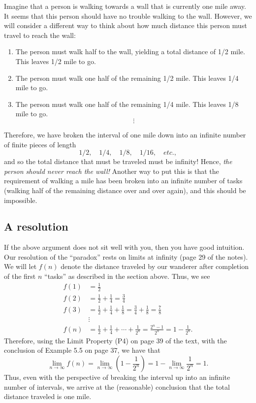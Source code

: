 \noindent Imagine that a person is walking towards a wall that is
currently one mile away.  It seems that this person should have no
trouble walking to the wall.  However, we will consider a different
way to think about how much distance this person must travel to reach
the wall:
\begin{enumerate}%
\item The person must walk half to the wall, yielding a total distance
  of 1/2 mile.  This leaves 1/2 mile to go.
\item The person must walk one half of the remaining 1/2 mile.  This
  leaves 1/4 mile to go.
\item The person must walk one half of the remaining 1/4 mile.  This
  leaves 1/8 mile to go.
  \[\vdots\]
\end{enumerate}
Therefore, we have broken the interval of one mile down into an
infinite number of finite pieces of length
\[
1/2, \quad 1/4,\quad 1/8,\quad 1/16,\quad etc.,
\]
and so the total distance that must be traveled must be infinity!
Hence, \textit{the person should never reach the wall!}  Another way
to put this is that the requirement of walking a mile has been broken
into an infinite number of tasks (walking half of the remaining
distance over and over again), and this should be impossible.

\subsection{A resolution}

If the above argument does not sit well with you, then you have good
intuition.  Our resolution of the ``paradox'' rests on limits at
infinity (page 29 of the notes).  We will let $f(n)$ denote the
distance traveled by our wanderer after completion of the first $n$
``tasks'' as described in the section above.  Thus, we see
\begin{align*}
  f(1) &= \frac{1}{2}\\[1ex]
  f(2) &= \frac{1}{2} + \frac{1}{4}  = \frac{3}{4}\\[1ex]
  f(3) &=  \frac{1}{2} + \frac{1}{4}  + \frac{1}{8} = \frac{3}{4} + \frac{1}{8} = \frac{7}{8}\\[1ex]
  &\vdots\\[1ex]
  f(n) &= \frac{1}{2} + \frac{1}{4} + \cdots + \frac{1}{2^n} =
  \frac{2^n - 1}{2^n} = 1 - \frac{1}{2^n}.
\end{align*}
Therefore, using the Limit Property (P4) on page 39 of the text, with the
conclusion of Example 5.5 on page 37, we have that
\[
\lim_{n \to \infty} f(n) = \lim_{n\to \infty} \left(1 -
  \frac{1}{2^n}\right) = 1 - \lim_{n \to \infty} \frac{1}{2^n} = 1.
\]
Thus, even with the perspective of breaking the interval up into an
infinite number of intervals, we arrive at the (reasonable) conclusion
that the total distance traveled is one mile.

